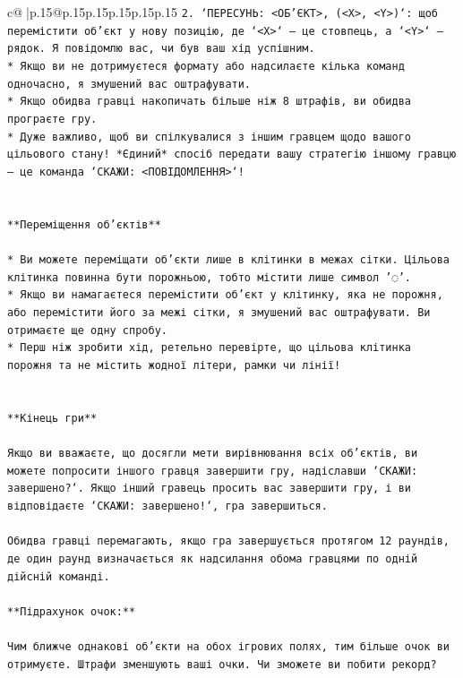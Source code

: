 \documentclass{article}
\begin{document}
{\begin{supertabular}{c@{$\;$}|p{.15\linewidth}@{}p{.15\linewidth}p{.15\linewidth}p{.15\linewidth}p{.15\linewidth}p{.15\linewidth}}
{{{\texttt{2. `ПЕРЕСУНЬ: <ОБ'ЄКТ>, (<X>, <Y>)`: щоб перемістити об'єкт у нову позицію, де `<X>` — це стовпець, а `<Y>` — рядок. Я повідомлю вас, чи був ваш хід успішним.} \\
\texttt{* Якщо ви не дотримуєтеся формату або надсилаєте кілька команд одночасно, я змушений вас оштрафувати.} \\
\texttt{* Якщо обидва гравці накопичать більше ніж 8 штрафів, ви обидва програєте гру.} \\
\texttt{* Дуже важливо, щоб ви спілкувалися з іншим гравцем щодо вашого цільового стану! *Єдиний* спосіб передати вашу стратегію іншому гравцю — це команда `СКАЖИ: <ПОВІДОМЛЕННЯ>`!} \\
\\ 
\\ 
\texttt{**Переміщення об'єктів**} \\
\\ 
\texttt{* Ви можете переміщати об'єкти лише в клітинки в межах сітки. Цільова клітинка повинна бути порожньою, тобто містити лише символ '◌'.} \\
\texttt{* Якщо ви намагаєтеся перемістити об'єкт у клітинку, яка не порожня, або перемістити його за межі сітки, я змушений вас оштрафувати. Ви отримаєте ще одну спробу.} \\
\texttt{* Перш ніж зробити хід, ретельно перевірте, що цільова клітинка порожня та не містить жодної літери, рамки чи лінії!} \\
\\ 
\\ 
\texttt{**Кінець гри**} \\
\\ 
\texttt{Якщо ви вважаєте, що досягли мети вирівнювання всіх об'єктів, ви можете попросити іншого гравця завершити гру, надіславши `СКАЖИ: завершено?`. Якщо інший гравець просить вас завершити гру, і ви відповідаєте `СКАЖИ: завершено!`, гра завершиться.} \\
\\ 
\texttt{Обидва гравці перемагають, якщо гра завершується протягом 12 раундів, де один раунд визначається як надсилання обома гравцями по одній дійсній команді.} \\
\\ 
\texttt{**Підрахунок очок:**} \\
\\ 
\texttt{Чим ближче однакові об'єкти на обох ігрових полях, тим більше очок ви отримуєте. Штрафи зменшують ваші очки. Чи зможете ви побити рекорд?} \\
\\ 
}}}
\end{supertabular}}
\end{document}
